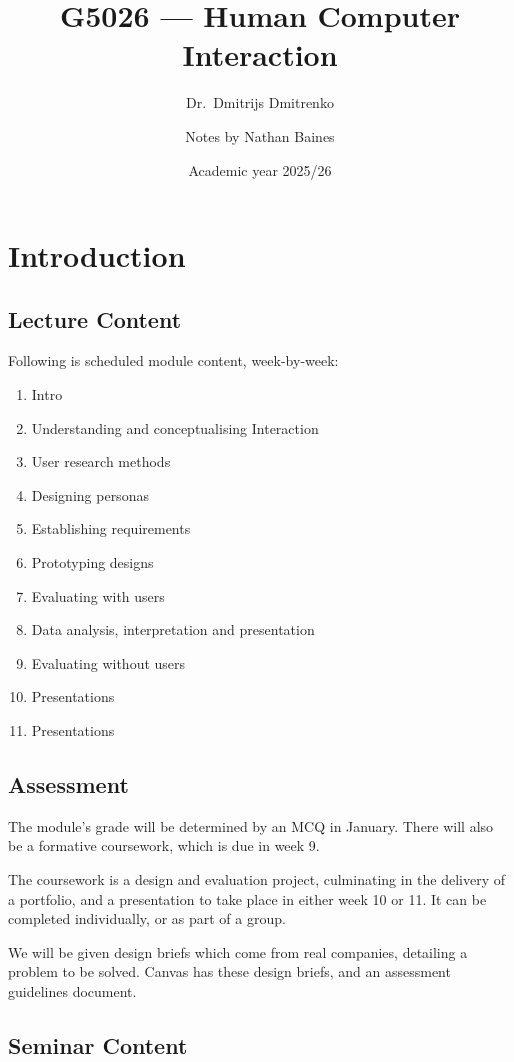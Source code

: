 \documentclass[a4paper]{article}
\title{G5026 --- Human Computer Interaction}
\author{Dr.\ Dmitrijs Dmitrenko \and Notes by Nathan Baines}
\date{Academic year 2025/26}
\begin{document}
\maketitle

\section{Introduction}

\subsection{Lecture Content}
Following is scheduled module content, week-by-week:
\begin{enumerate}
    \item Intro
    \item Understanding and conceptualising Interaction
    \item User research methods
    \item Designing personas
    \item Establishing requirements
    \item Prototyping designs
    \item Evaluating with users
    \item Data analysis, interpretation and presentation
    \item Evaluating without users
    \item Presentations
    \item Presentations
\end{enumerate}

\subsection{Assessment}
The module's grade will be determined by an MCQ in January. There will also be a formative coursework, which is due in week 9.

The coursework is a design and evaluation project, culminating in the delivery of a portfolio, and a presentation to take place in
either week 10 or 11. It can be completed individually, or as part of a group.

We will be given design briefs which come from real companies, detailing a problem to be solved. Canvas has these design briefs, and an
assessment guidelines document.

\subsection{Seminar Content}
\end{document}
